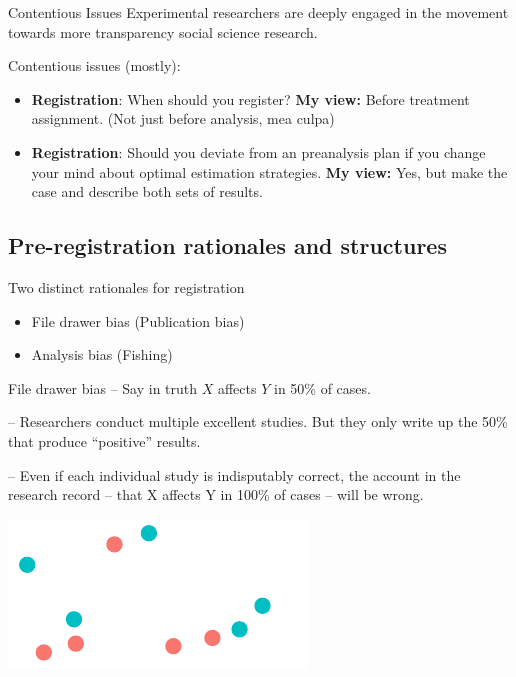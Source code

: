 \documentclass[
  11pt,
  ignorenonframetext,
]{beamer}
\begin{document}
\begin{frame}{Contentious Issues}
\protect\hypertarget{contentious-issues-3}{}
Experimental researchers are deeply engaged in the movement towards more
transparency social science research.

Contentious issues (mostly):

\begin{itemize}
\item
  \textbf{Registration}: When should you register? \textbf{My view:}
  Before treatment assignment. (Not just before analysis, mea culpa)
\item
  \textbf{Registration}: Should you deviate from an preanalysis plan if
  you change your mind about optimal estimation strategies. \textbf{My
  view:} Yes, but make the case and describe both sets of results.
\end{itemize}
\end{frame}

\hypertarget{pre-registration-rationales-and-structures}{%
\subsection{Pre-registration rationales and
structures}\label{pre-registration-rationales-and-structures}}

\begin{frame}{Two distinct rationales for registration}
\protect\hypertarget{two-distinct-rationales-for-registration}{}
\begin{itemize}
\item
  File drawer bias (Publication bias)
\item
  Analysis bias (Fishing)
\end{itemize}
\end{frame}

\begin{frame}{File drawer bias}
\protect\hypertarget{file-drawer-bias}{}
-- Say in truth \(X\) affects \(Y\) in 50\% of cases.

-- Researchers conduct multiple excellent studies. But they only write
up the 50\% that produce ``positive'' results.

-- Even if each individual study is indisputably correct, the account in
the research record -- that X affects Y in 100\% of cases -- will be
wrong.

\includegraphics{5.2_process_files/figure-beamer/unnamed-chunk-2-1.pdf}
\end{frame}
\end{document}
